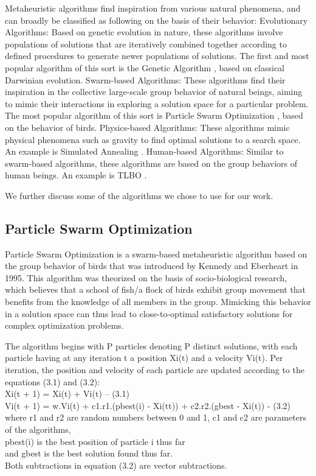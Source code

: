 Metaheuristic algorithms find inspiration from various natural phenomena, and can broadly be classified as following on the basis of their behavior:
Evolutionary Algorithms: Based on genetic evolution in nature, these algorithms involve populations of solutions that are iteratively combined together according to defined procedures to generate newer populations of solutions. The first and most popular algorithm of this sort is the Genetic Algorithm  \cite{9}, based on classical Darwinian evolution. 
Swarm-based Algorithms: These algorithms find their inspiration in the collective large-scale group behavior of natural beings, aiming to mimic their interactions in exploring a solution space for a particular problem. The most popular algorithm of this sort is Particle Swarm Optimization  \cite{10}, based on the behavior of birds. 
Physics-based Algorithms: These algorithms mimic physical phenomena such as gravity to find optimal solutions to a search space. An example is Simulated Annealing  \cite{22}. 
Human-based Algorithms: Similar to swarm-based algorithms, these algorithms are based on the group behaviors of human beings. An example is TLBO  \cite{23}.  

We further discuss some of the algorithms we chose to use for our work.
\subsection{Particle Swarm Optimization}
Particle Swarm Optimization  \cite{10} is a swarm-based metaheuristic algorithm based on the group behavior of birds that was introduced by Kennedy and Eberheart in 1995. This algorithm was theorized on the basis of socio-biological research, which believes that a school of fish/a flock of birds exhibit group movement that benefits from the knowledge of all members in the group. Mimicking this behavior in a solution space can thus lead to close-to-optimal satisfactory solutions for complex optimization problems. 

The algorithm begins with P particles denoting P distinct solutions, with each particle having at any iteration t a position Xi(t) and a velocity Vi(t). Per iteration, the position and velocity of each particle are updated according to the equations (3.1) and (3.2):\\ 
Xi(t + 1) = Xi(t) + Vi(t)          – (3.1)\\ 
Vi(t + 1) = w.Vi(t) + c1.r1.(pbest(i) - Xi(tt)) + c2.r2.(gbest - Xi(t))     - (3.2)\\
where r1 and r2 are random numbers between 0 and 1, c1 and c2 are parameters of the algorithms, \\
pbest(i) is the best position of particle i thus far \\
and gbest is the best solution found thus far. \\
Both subtractions in equation (3.2) are vector subtractions. 


